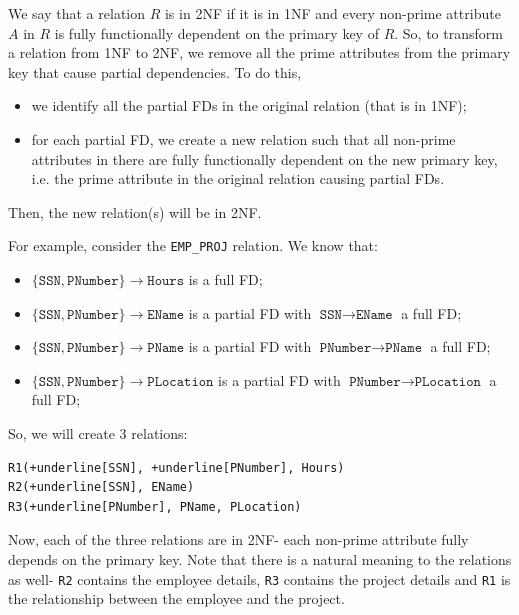 \documentclass[a4paper, openany]{memoir}
\begin{document}
We say that a relation $R$ is in 2NF if it is in 1NF and every non-prime attribute $A$ in $R$ is fully functionally dependent on the primary key of $R$. So, to transform a relation from 1NF to 2NF, we remove all the prime attributes from the primary key that cause partial dependencies. To do this, 
\begin{itemize}
    \item we identify all the partial FDs in the original relation (that is in 1NF);
    \item for each partial FD, we create a new relation such that all non-prime attributes in there are fully functionally dependent on the new primary key, i.e. the prime attribute in the original relation causing partial FDs.
\end{itemize}
Then, the new relation(s) will be in 2NF.

For example, consider the \texttt{EMP\_PROJ} relation. We know that:
\begin{itemize}
    \item $\{\texttt{SSN}, \texttt{PNumber}\} \to \texttt{Hours}$ is a full FD;
    \item $\{\texttt{SSN}, \texttt{PNumber}\} \to \texttt{EName}$ is a partial FD with $\texttt{SSN} \to \texttt{EName}$ a full FD;
    \item $\{\texttt{SSN}, \texttt{PNumber}\} \to \texttt{PName}$ is a partial FD with $\texttt{PNumber} \to \texttt{PName}$ a full FD;
    \item $\{\texttt{SSN}, \texttt{PNumber}\} \to \texttt{PLocation}$ is a partial FD with $\texttt{PNumber} \to \texttt{PLocation}$ a full FD;
\end{itemize}
So, we will create 3 relations:
\begin{Verbatim}[commandchars=+\[\]]
R1(+underline[SSN], +underline[PNumber], Hours)
R2(+underline[SSN], EName)
R3(+underline[PNumber], PName, PLocation)
\end{Verbatim}
Now, each of the three relations are in 2NF- each non-prime attribute fully depends on the primary key. Note that there is a natural meaning to the relations as well- \texttt{R2} contains the employee details, \texttt{R3} contains the project details and \texttt{R1} is the relationship between the employee and the project.
\end{document}
